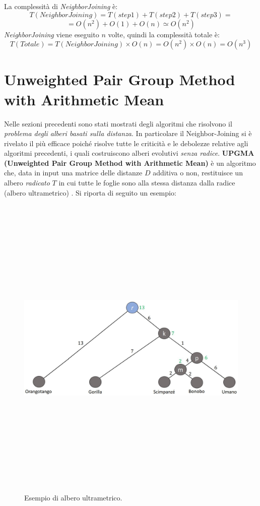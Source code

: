 La complessità di \textit{NeighborJoining} è:
	\[T(NeighborJoining)=T(step1)+T(step2)+T(step3)=\]
	\[=O(n^2)+O(1)+O(n)\simeq O(n^2)\]
\textit{NeighborJoining} viene eseguito $n$ volte, quindi la complessità totale è:
\[T(Totale)=T(NeighborJoining) \times O(n) = O(n^2) \times O(n) = O(n^3) \]

\newpage

\section{Unweighted Pair Group Method with Arithmetic Mean}
Nelle sezioni precedenti sono stati mostrati degli algoritmi che risolvono il \textit{problema degli alberi basati sulla distanza}. In particolare il Neighbor-Joining si è rivelato il più efficace poiché risolve tutte le criticità e le debolezze relative agli algoritmi precedenti, i quali costruiscono alberi evolutivi \textit{senza radice}.
\newline
\textbf{UPGMA (Unweighted Pair Group Method with Arithmetic Mean)} è un algoritmo che, data in input una matrice delle distanze $D$ additiva o non, restituisce un albero \textit{radicato} $T$ in cui tutte le foglie sono alla stessa distanza dalla radice (albero ultrametrico) \cite{understandingBioinf}.
\newline
Si riporta di seguito un esempio:
\begin{figure}[h!]
\centering
	\includegraphics[height=15cm, width=13cm, keepaspectratio]{rooted_upgma_1.jpg}
 	\caption{Esempio di albero ultrametrico.}
  	\label{fig:rooted_upgma_1}
\end{figure}
